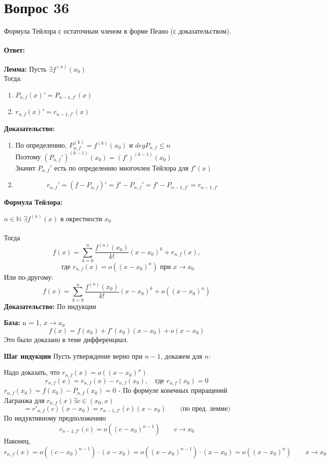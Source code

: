 \documentclass{article}
\DeclareMathOperator{\Exists}{\exists}
\begin{document}
 
\part*{Вопрос 36}
\begin{center}
Формула Тейлора с остаточным членом в форме Пеано (с доказательством).
\end{center}
\subsection*{Ответ:}
\textbf{Лемма:} Пусть $\Exists f^{(n)}(x_0)$\\
Тогда:
\begin{enumerate}
   \item $P_{n,f}(x)'=P_{n-1,f'}(x)$
   \item $r_{n,f}(x)'=r_{n-1,f'}(x)$
\end{enumerate}
\textbf{Доказательство:}
\begin{enumerate}
   \item По определению, $P_{n,f}^{(k)}= f^{(k)}(x_0)$ и $deg P_{n,f}\leqslant n$\\
   Поэтому $(P_{n,f}')^{(k-1)}(x_0)=(f')^{(k-1)}(x_0)$\\
   Значит $P_{n,f}'$ есть по определению многочлен Тейлора для $f'(x)$
   \item $$r_{n,f}'=(f-P_{n,f})'=f'-P_{n,f}'= f'-P_{n-1,f'}=r_{n-1,f'}$$
\end{enumerate}

\textbf{Формула Тейлора:}
\par$n\in\mathbb{N}$ $\Exists f^{(n)}(x)$ в окрестности $x_0$\\\\
Тогда
$$f(x)=\sum_{k=0}^n \frac{f^{(n)}(x_0)}{k!}(x-x_0)^k+r_{n, f}(x),$$
$$\text{ где } r_{n,f}(x) = o((x-x_0)^n)\text{ при }x\to x_0$$
Или по-другому:
$$f(x)=\sum_{k=0}^n \frac{f^{(n)}(x_0)}{k!}(x-x_0)^k+o((x-x_0)^n)$$
\textbf{Доказательство:} По индукции\\
\par\textbf{База:} n = 1, \quad $x\to x_0$\\
$$f(x) = f(x_0) + f'(x_0)(x-x_0)+o(x-x_0)$$
Это было доказано в теме дифференциал.\\
\par\textbf{Шаг индукции}
Пусть утверждение верно при $n-1$, докажем для $n$:\\
\par Надо доказать, что $r_{n,f}(x) = o((x-x_0)'')$
$$r_{n,f}(x)=r_{n,f}(x)-r_{n,f}(x_0),\quad\text{где }r_{n,f}(x_0) = 0$$
$\boxed{r_{n,f}(x_0)=f(x_0) - P_{n,f}(x_0) = 0}$ - По формуле конечных приращений Лагранжа для $r_{n,f}(x) \Exists c\in(x_0,x)$
$$= r'_{n,f}(c)(x-x_0)=r_{n-1,f'}(c)(x-x_0)\qquad\text{(по пред. лемме)}$$
По индуктивному предположению
$$r_{n-1, f'}(c)=o((c-x_0)^{n-1})\qquad c\to x_0$$
Наконец,
$$r_{n,f}(x)=o((c-x_0)^{n-1})\cdot(x-x_0)=o((x-x_0)^{n-1})\cdot(x-x_0)=o((x-x_0)^n)\qquad x\to x_0$$
 
\end{document}
